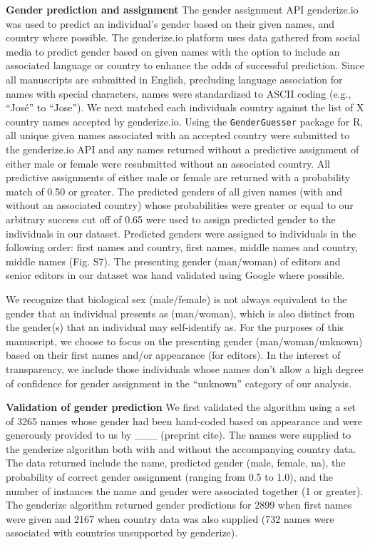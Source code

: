 \documentclass[11pt,]{article}
\begin{document}
\textbf{Gender prediction and assignment} The gender assignment API
genderize.io was used to predict an individual's gender based on their
given names, and country where possible. The genderize.io platform uses
data gathered from social media to predict gender based on given names
with the option to include an associated language or country to enhance
the odds of successful prediction. Since all manuscripts are submitted
in English, precluding language association for names with special
characters, names were standardized to ASCII coding (e.g., ``José'' to
``Jose''). We next matched each individuals country against the list of
X country names accepted by genderize.io. Using the
\texttt{GenderGuesser} package for R, all unique given names associated
with an accepted country were submitted to the genderize.io API and any
names returned without a predictive assignment of either male or female
were resubmitted without an associated country. All predictive
assignments of either male or female are returned with a probability
match of 0.50 or greater. The predicted genders of all given names (with
and without an associated country) whose probabilities were greater or
equal to our arbitrary success cut off of 0.65 were used to assign
predicted gender to the individuals in our dataset. Predicted genders
were assigned to individuals in the following order: first names and
country, first names, middle names and country, middle names (Fig. S7).
The presenting gender (man/woman) of editors and senior editors in our
dataset was hand validated using Google where possible.

We recognize that biological sex (male/female) is not always equivalent
to the gender that an individual presents as (man/woman), which is also
distinct from the gender(s) that an individual may self-identify as. For
the purposes of this manuscript, we choose to focus on the presenting
gender (man/woman/unknown) based on their first names and/or appearance
(for editors). In the interest of transparency, we include those
individuals whose names don't allow a high degree of confidence for
gender assignment in the ``unknown'' category of our analysis.

\textbf{Validation of gender prediction} We first validated the
algorithm using a set of 3265 names whose gender had been hand-coded
based on appearance and were generously provided to us by \_\_\_
(preprint cite). The names were supplied to the genderize algorithm both
with and without the accompanying country data. The data returned
include the name, predicted gender (male, female, na), the probability
of correct gender assignment (ranging from 0.5 to 1.0), and the number
of instances the name and gender were associated together (1 or
greater). The genderize algorithm returned gender predictions for 2899
when first names were given and 2167 when country data was also supplied
(732 names were associated with countries unsupported by genderize).
\end{document}
